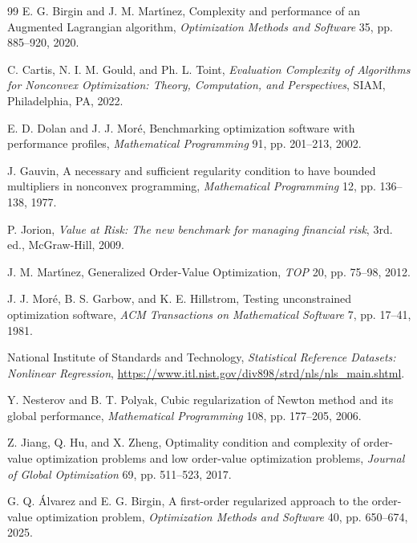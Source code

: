 \documentclass[11pt]{article}
\newcounter{alg}[section]
\begin{document}
\begin{thebibliography}{99}
 E. G. Birgin and J. M. Mart\'{\i}nez, Complexity and performance of an Augmented Lagrangian algorithm, \textit{Optimization Methods and Software} 35, pp. 885--920, 2020.

 C. Cartis, N. I. M. Gould, and Ph. L. Toint, \textit{Evaluation Complexity of Algorithms for Nonconvex Optimization: Theory, Computation, and Perspectives}, SIAM, Philadelphia, PA, 2022.

 E. D. Dolan and J. J. Mor\'e, Benchmarking optimization software with performance profiles, \textit{Mathematical Programming} 91, pp. 201--213, 2002.

 J. Gauvin, A necessary and sufficient regularity condition to have bounded multipliers in nonconvex programming, \textit{Mathematical Programming} 12, pp. 136--138, 1977.

 P. Jorion, \textit{Value at {R}isk: {T}he new benchmark for managing financial risk}, 3rd. ed., McGraw-Hill, 2009.

 J. M. Mart\'{\i}nez, Generalized Order-Value Optimization, \textit{TOP} 20, pp. 75--98, 2012.

 J. J. Mor\'e, B. S. Garbow, and K. E. Hillstrom, Testing unconstrained optimization software, \textit{ACM Transactions on Mathematical Software} 7, pp. 17--41, 1981.

 National Institute of Standards and Technology, \textit{Statistical Reference Datasets: Nonlinear Regression}, \url{https://www.itl.nist.gov/div898/strd/nls/nls_main.shtml}.

 Y. Nesterov and B. T. Polyak, Cubic regularization of Newton method and its global performance, \textit{Mathematical Programming} 108, pp. 177--205, 2006.

 Z. Jiang, Q. Hu, and X. Zheng, Optimality condition and complexity of order-value optimization problems and low order-value optimization problems, \textit{Journal of Global Optimization} 69, pp. 511--523, 2017.

 G. Q. Álvarez and E. G. Birgin, A first-order regularized approach to the order-value optimization problem, \textit{Optimization Methods and Software} 40, pp. 650--674, 2025.
    
\end{thebibliography}
\end{document}
